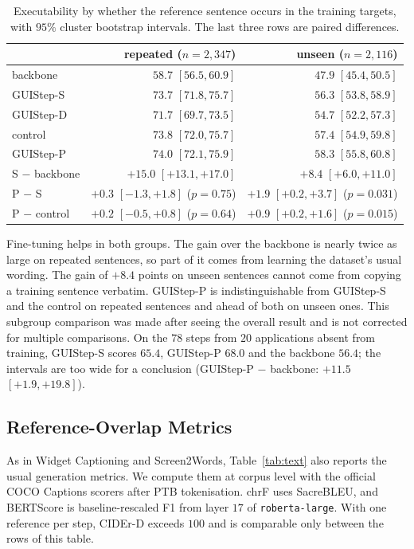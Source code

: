 \documentclass[runningheads,a4paper]{llncs}
\begin{document}
\begin{table}[t]
\centering
\caption{Executability by whether the reference sentence occurs in the training targets, with $95\%$
cluster bootstrap intervals. The last three rows are paired differences.}
\label{tab:repeat}
\small
\setlength{\tabcolsep}{3pt}
\begin{tabular}{lrr}
\toprule
& repeated ($n=2{,}347$) & unseen ($n=2{,}116$)\\
\midrule
backbone & $58.7$ $[56.5,60.9]$ & $47.9$ $[45.4,50.5]$\\
\mbox{GUIStep-S} & $73.7$ $[71.8,75.7]$ & $56.3$ $[53.8,58.9]$\\
\mbox{GUIStep-D} & $71.7$ $[69.7,73.5]$ & $54.7$ $[52.2,57.3]$\\
control & $73.8$ $[72.0,75.7]$ & $57.4$ $[54.9,59.8]$\\
\mbox{GUIStep-P} & $74.0$ $[72.1,75.9]$ & $58.3$ $[55.8,60.8]$\\
\midrule
S $-$ backbone & $+15.0$ $[+13.1,+17.0]$ & $+8.4$ $[+6.0,+11.0]$\\
P $-$ S & $+0.3$ $[-1.3,+1.8]$ ($p=0.75$) & $+1.9$ $[+0.2,+3.7]$ ($p=0.031$)\\
P $-$ control & $+0.2$ $[-0.5,+0.8]$ ($p=0.64$) & $+0.9$ $[+0.2,+1.6]$ ($p=0.015$)\\
\bottomrule
\end{tabular}
\end{table}

Fine-tuning helps in both groups. The gain over the backbone is nearly twice as large on repeated sentences, so part of it comes from learning the dataset's usual wording. The gain of $+8.4$ points on unseen sentences cannot come from copying a training sentence verbatim. \mbox{GUIStep-P} is indistinguishable from \mbox{GUIStep-S} and the control on repeated sentences and ahead of both on unseen ones. This
subgroup comparison was made after seeing the overall result and is not corrected for multiple
comparisons. On the $78$ steps from $20$ applications absent from training, \mbox{GUIStep-S} scores $65.4$, \mbox{GUIStep-P} $68.0$ and the backbone $56.4$; the intervals are too wide for a conclusion (\mbox{GUIStep-P} $-$ backbone: $+11.5$ $[+1.9,+19.8]$).

\subsection{Reference-Overlap Metrics}
As in Widget Captioning and Screen2Words, Table~\ref{tab:text} also reports the usual generation metrics. We compute them at corpus level with the official
COCO Captions scorers after PTB tokenisation. chrF uses SacreBLEU, and BERTScore is
baseline-rescaled F1 from layer $17$ of \texttt{roberta-large}. With one reference per step, CIDEr-D exceeds $100$ and is comparable only between the rows of this table.
\end{document}
